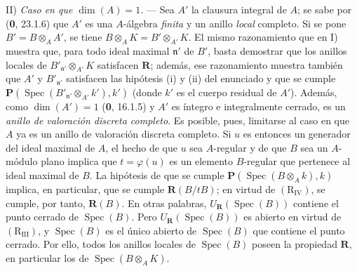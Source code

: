 II) \emph{Caso en que $\dim(A)=1$.} --- Sea $A'$ la clausura integral de
$A$; se sabe por (\textbf 0, 23.1.6) que $A'$ es una $A$-álgebra \emph{finita} y un
anillo \emph{local} completo. Si se pone $B'=B\otimes_A A'$, se tiene
$B\otimes_A K=B'\otimes_{A'}K$. El mismo razonamiento que en I) muestra
que, para todo ideal maximal $\mathfrak n'$ de $B'$, basta demostrar que
los anillos locales de $B'_{\mathfrak n'}\otimes_{A'}K$ satisfacen
$\boldsymbol R$; además, ese razonamiento muestra también que $A'$ y
$B'_{\mathfrak n'}$ satisfacen las hipótesis (i) y (ii) del enunciado y
que se cumple
$\boldsymbol P(\operatorname{Spec}(B'_{\mathfrak n'}\otimes_{A'}k'),k')$
(donde $k'$ es el cuerpo residual de $A'$). Además, como
$\dim(A')=1$ (\textbf 0, 16.1.5) y $A'$ es íntegro e integralmente cerrado,
es un \emph{anillo de valoración discreta completo}. Es posible, pues,
limitarse al caso en que $A$ ya es un anillo de valoración discreta
completo. Si $u$ es entonces un generador del ideal maximal de $A$,
el hecho de que $u$ sea $A$-regular y de que $B$ sea un $A$-módulo
plano implica que $t=\varphi(u)$ es un elemento $B$-regular que
pertenece al ideal maximal de $B$. La hipótesis de que se cumple
$\boldsymbol P(\operatorname{Spec}(B\otimes_A k),k)$ implica, en
particular, que se cumple $\boldsymbol R(B/tB)$; en virtud de
$(\mathrm R_{\mathrm{IV}})$, se cumple, por tanto, $\boldsymbol R(B)$.
En otras palabras, $U_{\mathbf R}(\operatorname{Spec}(B))$ contiene
el punto cerrado de $\operatorname{Spec}(B)$. Pero
$U_{\mathbf R}(\operatorname{Spec}(B))$ es abierto en virtud de
$(\mathrm R_{\mathrm{III}})$, y $\operatorname{Spec}(B)$ es el único
abierto de $\operatorname{Spec}(B)$ que contiene el punto cerrado.
Por ello, todos los anillos locales de $\operatorname{Spec}(B)$ poseen
la propiedad $\boldsymbol R$, en particular los de
$\operatorname{Spec}(B\otimes_A K)$.
